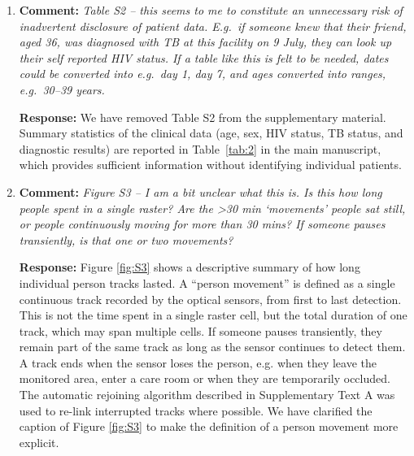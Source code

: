 \documentclass[11pt]{article}
\newcommand{\comment}[1]{\textbf{Comment:} \textit{#1}}
\newcommand{\response}[1]{\textbf{Response:} #1}
\begin{document}
\begin{enumerate}[label=\textbf{R2.\arabic*.}, leftmargin=*]
\response{We have expanded the description of the quanta generation rate distribution in Supplementary Text C. The quanta generation rate is sampled from activity-specific lognormal prior distributions with median rates of 1.08 quanta/h while sitting and 2.81 quanta/h while walking. The lognormal distribution has a long right tail: the 95\%-credible interval extends to 386 quanta/h (sitting) and 987 quanta/h (walking), which readily encompasses the extreme quanta generation rates reported by \citet{escombe2007ClinInfectDis} (226 q/h). This parametrisation was specifically chosen to capture the marked heterogeneity in infectiousness that characterises TB epidemiology, where a small number of ``superspreaders'' may generate the majority of secondary infections. The full distribution is shown in Figure E of the Supplementary Material of our model development paper \citep{banholzer2025PLOSComputBiol}. We have added an explicit reference to this figure and the distributional parameters in the revised Supplementary Text C (p.\,\pageref{chg:R2.23}).}

\item\label{r:2.24} \comment{Table S2 -- this seems to me to constitute an unnecessary risk of inadvertent disclosure of patient data. E.g.\ if someone knew that their friend, aged 36, was diagnosed with TB at this facility on 9 July, they can look up their self reported HIV status. If a table like this is felt to be needed, dates could be converted into e.g.\ day 1, day 7, and ages converted into ranges, e.g.\ 30--39 years.}

\response{We have removed Table S2 from the supplementary material. Summary statistics of the clinical data (age, sex, HIV status, TB status, and diagnostic results) are reported in Table~\ref{tab:2} in the main manuscript, which provides sufficient information without identifying individual patients.}

\item\label{r:2.25} \comment{Figure S3 -- I am a bit unclear what this is. Is this how long people spent in a single raster? Are the >30 min `movements' people sat still, or people continuously moving for more than 30 mins? If someone pauses transiently, is that one or two movements?}

\response{Figure \ref{fig:S3} shows a descriptive summary of how long individual person tracks lasted. A ``person movement'' is defined as a single continuous track recorded by the optical sensors, from first to last detection. This is not the time spent in a single raster cell, but the total duration of one track, which may span multiple cells. If someone pauses transiently, they remain part of the same track as long as the sensor continues to detect them. A track ends when the sensor loses the person, e.g. when they leave the monitored area, enter a care room or when they are temporarily occluded. The automatic rejoining algorithm described in Supplementary Text A was used to re-link interrupted tracks where possible. We have clarified the caption of Figure \ref{fig:S3} to make the definition of a person movement more explicit.}


\end{enumerate}
\end{document}
